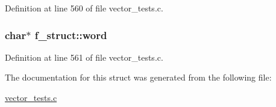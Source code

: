 \-Definition at line 560 of file vector\-\_\-tests.\-c.

\hypertarget{structf__struct_aa8f65f08c5e6180da916f9001438eab5}{
\subsubsection[{word}]{\setlength{\rightskip}{0pt plus 5cm}char$\ast$ {\bf f\-\_\-struct\-::word}}}\label{structf__struct_aa8f65f08c5e6180da916f9001438eab5}


\-Definition at line 561 of file vector\-\_\-tests.\-c.



\-The documentation for this struct was generated from the following file\-:\begin{DoxyCompactItemize}
\item 
\hyperlink{vector__tests_8c}{vector\-\_\-tests.\-c}\end{DoxyCompactItemize}

